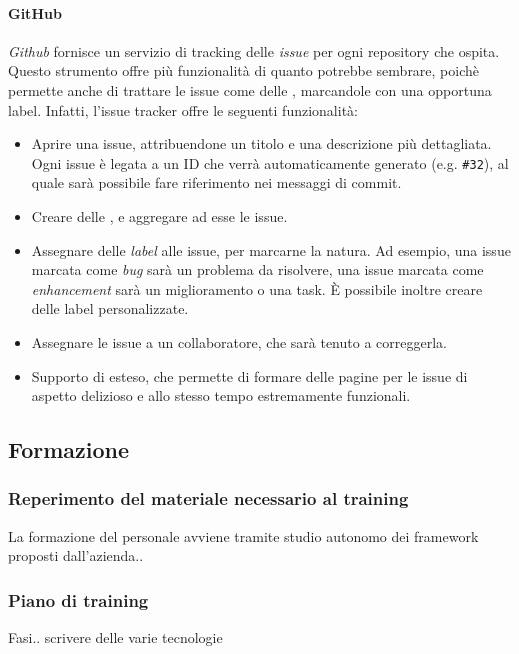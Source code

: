     		\paragraph{GitHub}
			\emph{Github} fornisce un servizio di tracking delle \emph{issue} per ogni repository che ospita. Questo strumento offre più funzionalità di quanto potrebbe
			sembrare, poichè permette anche di trattare le issue come delle , marcandole con una opportuna label. Infatti, l'issue tracker offre le seguenti 
			funzionalità:
			\begin{itemize}
				\item Aprire una issue, attribuendone un titolo e una descrizione più dettagliata. Ogni issue è legata a un ID che verrà automaticamente generato (e.g. \texttt{\#32}),
					al quale sarà possibile fare riferimento nei messaggi di commit.
				\item Creare delle , e aggregare ad esse le issue.
				\item Assegnare delle \emph{label} alle issue, per marcarne la natura. Ad esempio, una issue marcata come \emph{bug} sarà un problema da risolvere,
					una issue marcata come \emph{enhancement} sarà un miglioramento o una task. È possibile inoltre creare delle label personalizzate.
				\item Assegnare le issue a un collaboratore, che sarà tenuto a correggerla.
				\item Supporto di  esteso, che permette di formare delle pagine per le issue di aspetto delizioso e allo stesso tempo estremamente funzionali.
			\end{itemize}
    		

			
	
	\subsection{Formazione}		
	
		\subsubsection{Reperimento del materiale necessario al training}
		La formazione del personale avviene tramite studio autonomo dei framework proposti dall'azienda..
		
		\subsubsection{Piano di training}
		Fasi..
		scrivere delle varie tecnologie
